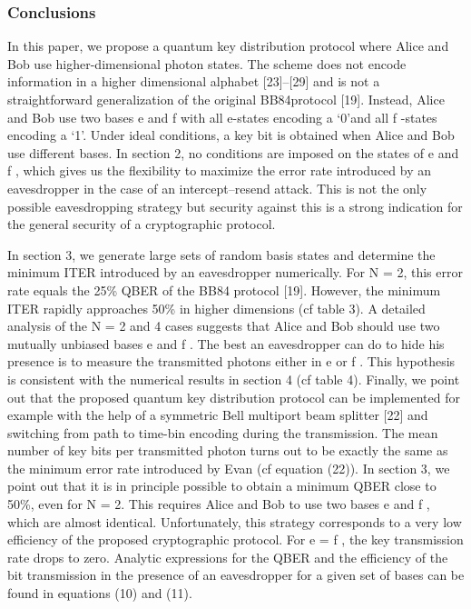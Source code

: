 \subsubsection{Conclusions}

In this paper, we propose a quantum key distribution protocol where Alice and Bob use higher-dimensional photon states. The scheme does not encode information in a higher dimensional alphabet [23]–[29] and is not a straightforward generalization of the original BB84protocol [19]. Instead, Alice and Bob use two bases e and f with all e-states encoding a ‘0’and all f -states encoding a ‘1’. Under ideal conditions, a key bit is obtained when Alice and Bob use different bases. In section 2, no conditions are imposed on the states of e and f , which gives us the flexibility to maximize the error rate introduced by an eavesdropper in the case of an intercept–resend attack. This is not the only possible eavesdropping strategy but security against this is a strong indication for the general security of a cryptographic protocol.

In section 3, we generate large sets of random basis states and determine the minimum ITER introduced by an eavesdropper numerically. For N = 2, this error rate equals the 25\% QBER of the BB84 protocol [19]. However, the minimum ITER rapidly approaches 50\% in higher dimensions (cf table 3). A detailed analysis of the N = 2 and 4 cases suggests that Alice and Bob should use two mutually unbiased bases e and f . The best an eavesdropper can do to hide his presence is to measure the transmitted photons either in e or f . This hypothesis is consistent with the numerical results in section 4 (cf table 4). Finally, we point out that the proposed quantum key distribution protocol can be implemented for example with the help of a symmetric Bell multiport beam splitter [22] and switching from path to time-bin encoding during the transmission. The mean number of key bits per transmitted photon turns out to be exactly the same as the minimum error rate introduced by Evan (cf equation (22)).
In section 3, we point out that it is in principle possible to obtain a minimum QBER close to 50\%, even for N = 2. This requires Alice and Bob to use two bases e and f , which are almost identical. Unfortunately, this strategy corresponds to a very low efficiency of the proposed cryptographic protocol. For e = f , the key transmission rate drops to zero. Analytic expressions for the QBER and the efficiency of the bit transmission in the presence of an eavesdropper for a given set of bases can be found in equations (10) and (11).

